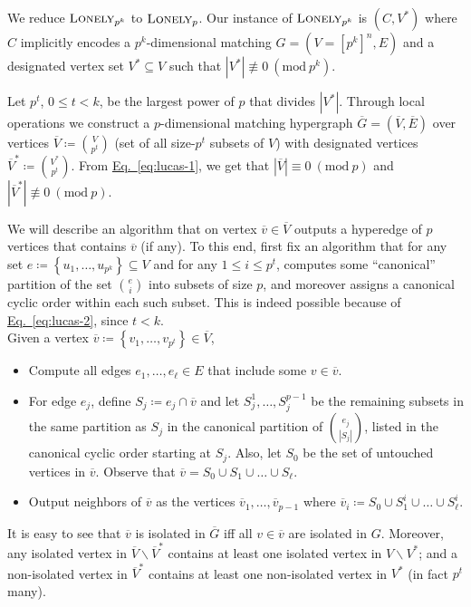 \documentclass[10pt,a4paper]{article}
\theoremstyle{definition}
\theoremstyle{remark}
\newcommand{\inparen}[1]{\left ( #1 \right )}
\renewcommand{\mod}[1]{~\inparen{\mathrm{mod}~#1}}
\def\set#1{\left\{#1\right\}}
\newcommand{\lonely}{\ensuremath\textsc{Lonely}}
\newcommand{\eqnref}[1]{\hyperref[#1]{Eq.~\ref{#1}}}
\begin{document}
\noindent We reduce $\lonely_{p^k}$ to $\lonely_p$. Our instance of $\lonely_{p^k}$ is $(C,V^*)$ where $C$ implicitly encodes a ${p^k}$-dimensional matching $G = (V = [p^k]^n, E)$ and a designated vertex set $V^* \subseteq V$ such that $|V^*| \not\equiv 0 \mod{p^k}$.

Let $p^t$, $0 \le t < k$, be the largest power of $p$ that divides $|V^*|$. Through local operations we construct a $p$-dimensional matching hypergraph $\overline{G} = (\overline{V}, \overline{E})$ over vertices $\overline{V} \coloneqq \binom{V}{p^t}$ (set of all size-$p^t$ subsets of $V$) with designated vertices $\overline{V}^*\coloneqq\binom{V^*}{p^t}$. From \eqnref{eq:lucas-1}, we get that $|\overline{V}| \equiv 0 \mod{p}$ and $|\overline{V}^*| \not\equiv 0 \mod{p}$.

We will describe an algorithm that on vertex $\overline{v} \in \overline{V}$ outputs a hyperedge of $p$ vertices that contains $\overline{v}$ (if any). To this end, first fix an algorithm that for any set $e \coloneqq \set{u_1, \ldots, u_{p^k}} \subseteq V$ and for any $1 \le i \le p^t$, computes some ``canonical'' partition of the set $\binom{e}{i}$ into subsets of size $p$, and moreover assigns a canonical cyclic order within each such subset. This is indeed possible because of \eqnref{eq:lucas-2}, since $t < k$.\\[-0.2cm]

\noindent Given a vertex $\overline{v} \coloneqq \set{v_1, \ldots, v_{p^t}} \in \overline{V}$,\vspace{-0.2cm}
\begin{itemize}[label=$\triangleright$,leftmargin=0.6cm]
\item Compute all edges $e_1, \ldots, e_\ell \in E$ that include some $v \in \overline{v}$.
\item For edge $e_j$, define $S_j \coloneqq e_j \cap \overline{v}$ and let $S_j^1, \ldots, S_j^{p-1}$ be the remaining subsets in the same partition as $S_j$ in the canonical partition of $\binom{e_j}{|S_j|}$, listed in the canonical cyclic order starting at $S_j$. Also, let $S_0$ be the set of untouched vertices in $\overline{v}$. Observe that $\overline{v} = S_0 \cup S_1 \cup \ldots \cup S_\ell$.
\item Output neighbors of $\overline{v}$ as the vertices $\overline{v}_1, \ldots, \overline{v}_{p-1}$ where $\overline{v}_i \coloneqq S_0 \cup S_1^i \cup \ldots \cup S_{\ell}^i$.
\end{itemize}

\noindent It is easy to see that $\overline{v}$ is isolated in $\overline{G}$ iff all $v \in \overline{v}$ are isolated in $G$. Moreover, any isolated vertex in $\overline{V} \smallsetminus \overline{V}^*$ contains at least one isolated vertex in $V \smallsetminus V^*$; and a non-isolated vertex in $\overline{V}^*$ contains at least one non-isolated vertex in $V^*$ (in fact $p^t$ many).
\end{document}
